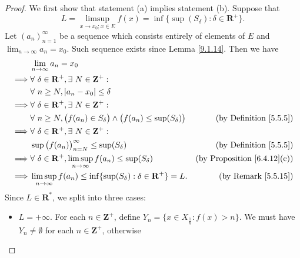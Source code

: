 \begin{proof}
    We first show that statement (a) implies statement (b).
    Suppose that
    \[
        L = \limsup_{x \to x_0 ; x \in E} f(x) = \inf\{\sup(S_\delta) : \delta \in \mathbf{R}^+\}.
    \]
    Let \((a_n)_{n = 1}^\infty\) be a sequence which consists entirely of elements of \(E\) and \(\lim_{n \to \infty} a_n = x_0\).
    Such sequence exists since Lemma \ref{9.1.14}.
    Then we have
    \begin{align*}
                 & \lim_{n \to \infty} a_n = x_0                                                                                                             \\
        \implies & \forall\ \delta \in \mathbf{R}^+, \exists\ N \in \mathbf{Z}^+ :                                                                           \\
                 & \forall\ n \geq N, \abs*{a_n - x_0} \leq \delta                                                                                           \\
        \implies & \forall\ \delta \in \mathbf{R}^+, \exists\ N \in \mathbf{Z}^+ :                                                                           \\
                 & \forall\ n \geq N, \big(f(a_n) \in S_{\delta}\big) \land \big(f(a_n) \leq \sup(S_{\delta})\big) & \text{(by Definition \ref{5.5.5})}      \\
        \implies & \forall\ \delta \in \mathbf{R}^+, \exists\ N \in \mathbf{Z}^+ :                                                                           \\
                 & \sup\big(f(a_n)\big)_{n = N}^\infty \leq \sup(S_{\delta})                                       & \text{(by Definition \ref{5.5.5})}      \\
        \implies & \forall\ \delta \in \mathbf{R}^+, \limsup_{n \to \infty} f(a_n) \leq \sup(S_{\delta})           & \text{(by Proposition \ref{6.4.12}(c))} \\
        \implies & \limsup_{n \to \infty} f(a_n) \leq \inf\{\sup(S_{\delta}) : \delta \in \mathbf{R}^+\} = L.      & \text{(by Remark \ref{5.5.15})}
    \end{align*}
    Since \(L \in \mathbf{R}^*\), we split into three cases:
    \begin{itemize}
        \item \(L = +\infty\).
              For each \(n \in \mathbf{Z}^+\), define \(Y_n = \{x \in X_{\frac{1}{n}} : f(x) > n\}\).
              We must have \(Y_n \neq \emptyset\) for each \(n \in \mathbf{Z}^+\), otherwise

\end{itemize}
\end{proof}
